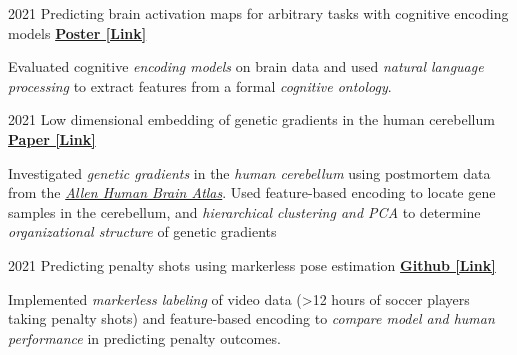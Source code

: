 \begin{cventries}
  \cventry
    {2021} %
    {Predicting brain activation maps for arbitrary tasks with cognitive encoding models} %
    {\href{https://drive.google.com/file/d/1dRNSsRzGSSF9QJLJv_jK1R7BmmWfOsMt/view}{\textbf{Poster [Link]}}}
    {}
    {
      \begin{cvitems} %
      	\item {Evaluated cognitive \textit{encoding models} on brain data and used \textit{natural language processing} to extract features from a formal \textit{cognitive ontology}.}
      \end{cvitems}
    }   
    
    
  \cventry
    {2021} %
    {Low dimensional embedding of genetic gradients in the human cerebellum} %
    {\href{https://papers.ssrn.com/sol3/papers.cfm?abstract_id=3797269}{\textbf{Paper [Link]}}}
    {}
    {
      \begin{cvitems} %
      	\item {Investigated \textit{genetic gradients} in the \textit{human cerebellum} using postmortem data from the \href{https://human.brain-map.org/}{\textit{Allen Human Brain Atlas}}. Used feature-based encoding to locate gene samples in the cerebellum, and \textit{hierarchical clustering and PCA} to determine \textit{organizational structure} of genetic gradients}
      \end{cvitems}
    }
    
  \cventry
    {2021} %
    {Predicting penalty shots using markerless pose estimation} %
    {\href{https://github.com/maedbhk/action_prediction}{\textbf{Github [Link]}}}
    {}
    {
      \begin{cvitems} %
      	\item {Implemented \textit{markerless labeling} of video data (>12 hours of soccer players taking penalty shots) and feature-based encoding to \textit{compare model and human performance} in predicting penalty outcomes.}
      \end{cvitems}
    }   
    

\end{cventries}
